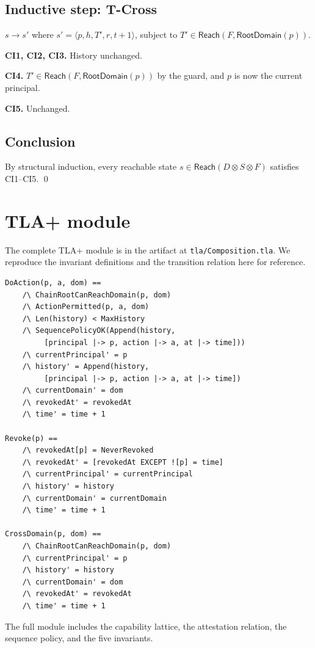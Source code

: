 \documentclass[11pt,a4paper]{article}
\theoremstyle{plain}
\theoremstyle{definition}
\theoremstyle{remark}
\begin{document}
\subsection{Inductive step: T-Cross}

$s \to s'$ where $s' = \langle p, h, T', r, t + 1 \rangle$, subject to
$T' \in \mathsf{Reach}(F, \mathsf{RootDomain}(p))$.

\textbf{CI1, CI2, CI3.} History unchanged.

\textbf{CI4.} $T' \in \mathsf{Reach}(F, \mathsf{RootDomain}(p))$ by the guard,
and $p$ is now the current principal.

\textbf{CI5.} Unchanged.

\subsection{Conclusion}

By structural induction, every reachable state $s \in \mathsf{Reach}(D \otimes
S \otimes F)$ satisfies CI1--CI5. \qed

\section{TLA+ module}
\label{app:tla}

The complete TLA+ module is in the artifact at
\texttt{tla/Composition.tla}. We reproduce the invariant definitions and the
transition relation here for reference.

\begin{lstlisting}[language=TLA+]
DoAction(p, a, dom) ==
    /\ ChainRootCanReachDomain(p, dom)
    /\ ActionPermitted(p, a, dom)
    /\ Len(history) < MaxHistory
    /\ SequencePolicyOK(Append(history,
         [principal |-> p, action |-> a, at |-> time]))
    /\ currentPrincipal' = p
    /\ history' = Append(history,
         [principal |-> p, action |-> a, at |-> time])
    /\ currentDomain' = dom
    /\ revokedAt' = revokedAt
    /\ time' = time + 1

Revoke(p) ==
    /\ revokedAt[p] = NeverRevoked
    /\ revokedAt' = [revokedAt EXCEPT ![p] = time]
    /\ currentPrincipal' = currentPrincipal
    /\ history' = history
    /\ currentDomain' = currentDomain
    /\ time' = time + 1

CrossDomain(p, dom) ==
    /\ ChainRootCanReachDomain(p, dom)
    /\ currentPrincipal' = p
    /\ history' = history
    /\ currentDomain' = dom
    /\ revokedAt' = revokedAt
    /\ time' = time + 1
\end{lstlisting}

The full module includes the capability lattice, the attestation relation, the
sequence policy, and the five invariants.
\end{document}
